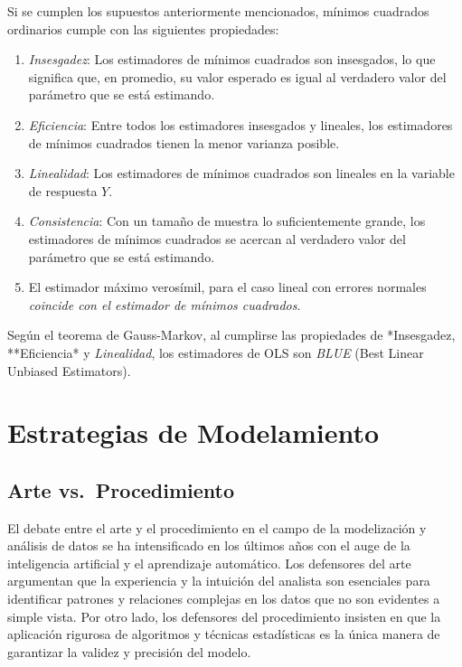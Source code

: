 \documentclass[
]{book}
\begin{document}
Si se cumplen los supuestos anteriormente mencionados, mínimos cuadrados
ordinarios cumple con las siguientes propiedades:

\begin{enumerate}
\def\labelenumi{\arabic{enumi}.}
\item
  \emph{Insesgadez}: Los estimadores de mínimos cuadrados son insesgados,
  lo que significa que, en promedio, su valor esperado es igual al
  verdadero valor del parámetro que se está estimando.
\item
  \emph{Eficiencia}: Entre todos los estimadores insesgados y lineales, los
  estimadores de mínimos cuadrados tienen la menor varianza posible.
\item
  \emph{Linealidad}: Los estimadores de mínimos cuadrados son lineales en
  la variable de respuesta \(Y\).
\item
  \emph{Consistencia}: Con un tamaño de muestra lo suficientemente grande,
  los estimadores de mínimos cuadrados se acercan al verdadero valor
  del parámetro que se está estimando.
\item
  El estimador máximo verosímil, para el caso lineal con errores
  normales \emph{coincide con el estimador de mínimos cuadrados}.
\end{enumerate}

Según el teorema de Gauss-Markov, al cumplirse las propiedades de
*Insesgadez, **Eficiencia* y \emph{Linealidad}, los estimadores de OLS
son \emph{BLUE} (Best Linear Unbiased Estimators).

\hypertarget{estrategias-de-modelamiento-1}{%
\section{Estrategias de Modelamiento}\label{estrategias-de-modelamiento-1}}

\hypertarget{arte-vs.-procedimiento-1}{%
\subsection{Arte vs.~Procedimiento}\label{arte-vs.-procedimiento-1}}

El debate entre el arte y el procedimiento en el campo de la
modelización y análisis de datos se ha intensificado en los últimos años
con el auge de la inteligencia artificial y el aprendizaje automático.
Los defensores del arte argumentan que la experiencia y la intuición del
analista son esenciales para identificar patrones y relaciones complejas
en los datos que no son evidentes a simple vista. Por otro lado, los
defensores del procedimiento insisten en que la aplicación rigurosa de
algoritmos y técnicas estadísticas es la única manera de garantizar la
validez y precisión del modelo.
\end{document}
